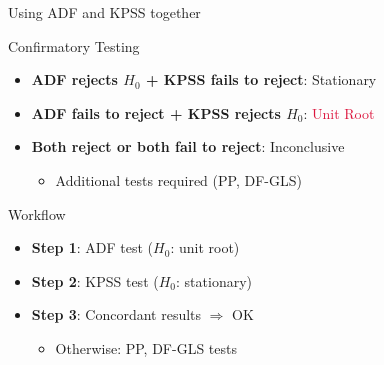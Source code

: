 \documentclass[9pt, aspectratio=169, t]{beamer}
\begin{document}
\begin{frame}{Using ADF and KPSS together}
    \begin{block}{Confirmatory Testing}
            \begin{itemize}\setlength{\itemsep}{0pt}
                \item \textbf{ADF rejects $H_0$ + KPSS fails to reject}: \textcolor{Forest}{Stationary}
                \item \textbf{ADF fails to reject + KPSS rejects $H_0$}: \textcolor{Crimson}{Unit Root}
                \item \textbf{Both reject or both fail to reject}: Inconclusive
                \begin{itemize}
                    \item Additional tests required (PP, DF-GLS)
                \end{itemize}
            \end{itemize}
        \end{block}
    
    \vspace{0.1cm}
    
    \begin{exampleblock}{Workflow}
            \begin{itemize}\setlength{\itemsep}{0pt}
                \item \textbf{Step 1}: ADF test ($H_0$: unit root)
                \item \textbf{Step 2}: KPSS test ($H_0$: stationary)
                \item \textbf{Step 3}: Concordant results $\Rightarrow$ OK
                \begin{itemize}
                    \item Otherwise: PP, DF-GLS tests
                \end{itemize}
            \end{itemize}
        \end{exampleblock}
\end{frame}
\end{document}
